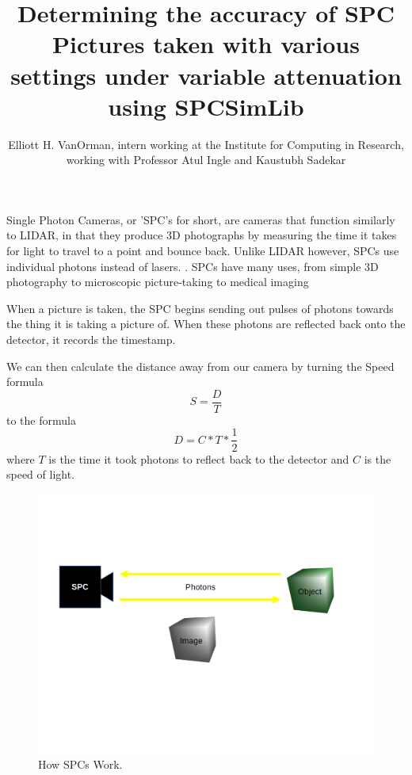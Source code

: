 \documentclass[aspectratio=169]{beamer}
\title{Determining the accuracy of SPC Pictures taken with various settings under variable attenuation using SPCSimLib \cite{spc}}
\author{\color{Blue}Elliott H. VanOrman, intern working at the Institute for Computing in Research, working with Professor Atul Ingle and Kaustubh Sadekar}
\begin{document}
\color{Blue}
\maketitle

\begin{frame}
\end{frame}

\begin{frame}
  Single Photon Cameras, or 'SPC's for short, are cameras that function similarly to LIDAR, in that they produce 3D photographs by measuring the time it takes for light to travel to a point and bounce back. Unlike LIDAR however, SPCs use individual photons instead of lasers. \cite{ingle} \cite{sadekar}. SPCs have many uses, from simple 3D photography to microscopic picture-taking to medical imaging\cite{SPCtopic}
  
  When a picture is taken, the SPC begins sending out pulses of photons towards the thing it is taking a picture of. When these photons are reflected back onto the detector, it records the timestamp.\cite{sadekar}
\end{frame}

\begin{frame}
  We can then calculate the distance away from our camera by turning the Speed formula \[S=\frac{D}{T}\] to the formula \[D=C*T*\frac{1}{2}\] where $T$ is the time it took photons to reflect back to the detector and $C$ is the speed of light.\cite{ingle}\cite{sadekar}
\end{frame}

\begin{frame}
  \begin{figure}[H]
    \centering
    \includegraphics[width=0.75\linewidth]{SPCExplained.png}
    \caption{\label{fig:Data}\color{Blue}How SPCs Work.}
  \end{figure}
\end{frame}
\end{document}

